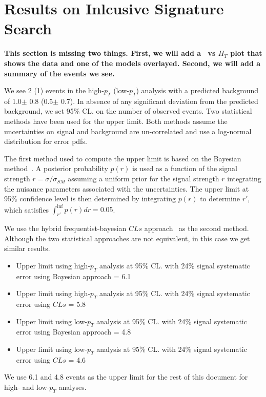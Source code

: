 \section{Results on Inlcusive Signature Search}
\label{sec:inclresults}

{\bf This section is missing two things. 
First, we will add a \met\ vs $H_T$ plot that shows the data and
one of the models overlayed. 
Second, we will add a summary of the events we see. 
}



We see 2 (1) events in the high-$p_T$ (low-$p_T$) analysis with a predicted background of
1.0$\pm$ 0.8 (0.5$\pm$ 0.7).
In absence of any significant deviation from the predicted background, we set 95\% CL. on the number of observed events. 
Two statistical methods have been used for the upper limit. 
Both methods assume the uncertainties on signal and background are un-correlated and use a log-normal distribution for error pdfs. 

The first method used to compute the upper limit is based on the Bayesian method~\cite{bayesian}.
A posterior probability $p(r)$ is used as a function of the signal strength $r = \sigma/\sigma_{SM}$ 
assuming a uniform prior for the signal strength $r$ integrating the nuisance parameters associated with the uncertainties.
The upper limit at 95\% confidence level is then determined by integrating $p(r)$ to determine $r'$, 
which satisfies $\int_{r'}^{\inf} p(r) dr = 0.05$.

We use the hybrid frequentist-bayesian $CLs$ approach~\cite{CLSxx} as the second method. 
Although the two statistical approaches are not equivalent, in this case we get similar results. 

\begin{itemize}
\item Upper limit using high-$p_T$ analysis at 95\% CL. with 24\% signal systematic error using Bayesian approach = 6.1  
\item Upper limit using high-$p_T$ analysis at 95\% CL. with 24\% signal systematic error using $CLs$ = 5.8  
\item Upper limit using low-$p_T$ analysis at 95\% CL. with 24\% signal systematic error using Bayesian approach = 4.8  
\item Upper limit using low-$p_T$ analysis at 95\% CL. with 24\% signal systematic error using $CLs$ = 4.6  
\end{itemize}

We use 6.1 and 4.8 events as the upper limit for the rest of this document for high- and low-$p_T$ analyses.

